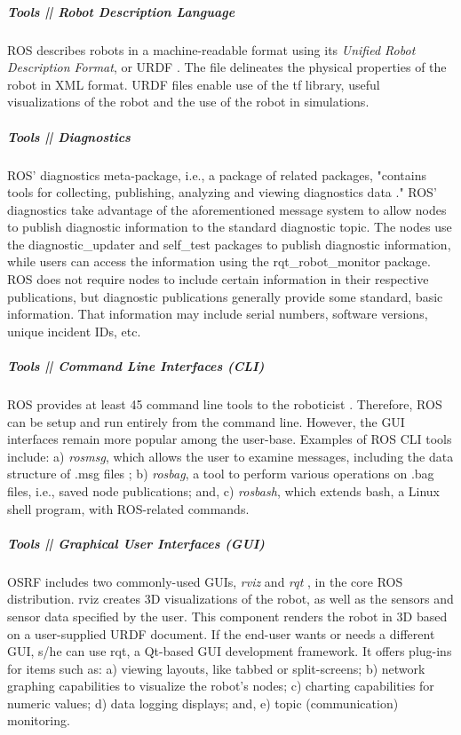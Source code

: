 \documentclass[9pt,twocolumn,twoside]{../../styles/osajnl}
\begin{document}
\subparagraph{Tools || Robot Description Language}
ROS describes robots in a machine-readable format using its \textit{Unified Robot Description Format}, or URDF \cite{www-ros-core-components}.  The file delineates the physical properties of the robot in XML format.  URDF files enable use of the tf library, useful visualizations of the robot and the use of the robot in simulations.  

\subparagraph{Tools || Diagnostics}
ROS' diagnostics meta-package, i.e., a package of related packages,  "contains tools for collecting, publishing, analyzing and viewing diagnostics data \cite{www-ros-diagnostics}."  ROS' diagnostics take advantage of the aforementioned message system to allow nodes to publish diagnostic information to the standard diagnostic topic.  The nodes use the diagnostic\_updater and self\_test packages to publish diagnostic information, while users can access the information using the rqt\_robot\_monitor package.  ROS does not require nodes to include certain information in their respective publications, but diagnostic publications generally provide some standard, basic information.  That information may include serial numbers, software versions, unique incident IDs, etc. 

\subparagraph{Tools || Command Line Interfaces (CLI)}

ROS provides at least 45 command line tools to the roboticist \cite{www-ros-cli}.  Therefore, ROS can be setup and run entirely from the command line.  However, the GUI interfaces remain more popular among the user-base.  Examples of ROS CLI tools include: a) \textit{rosmsg}, which allows the user to examine messages, including the data structure of .msg files \cite{www-ros-messages}; b) \textit{rosbag}, a tool to perform various operations on .bag files, i.e., saved node publications; and, c) \textit{rosbash}, which extends bash, a Linux shell program, with ROS-related commands. 

\subparagraph{Tools || Graphical User Interfaces (GUI)}
OSRF includes two commonly-used GUIs, \textit{rviz} and \textit{rqt} \cite{www-ros-core-components}, in the core ROS distribution.  rviz creates 3D visualizations of the robot, as well as the sensors and sensor data specified by the user.  This component renders the robot in 3D based on a user-supplied URDF document.  If the end-user wants or needs a different GUI, s/he can use rqt, a Qt-based GUI development framework.  It offers plug-ins for items such as: a) viewing layouts, like tabbed or split-screens; b) network graphing capabilities to visualize the robot's nodes; c) charting capabilities for numeric values; d) data logging displays; and, e) topic (communication) monitoring.   
\end{document}
